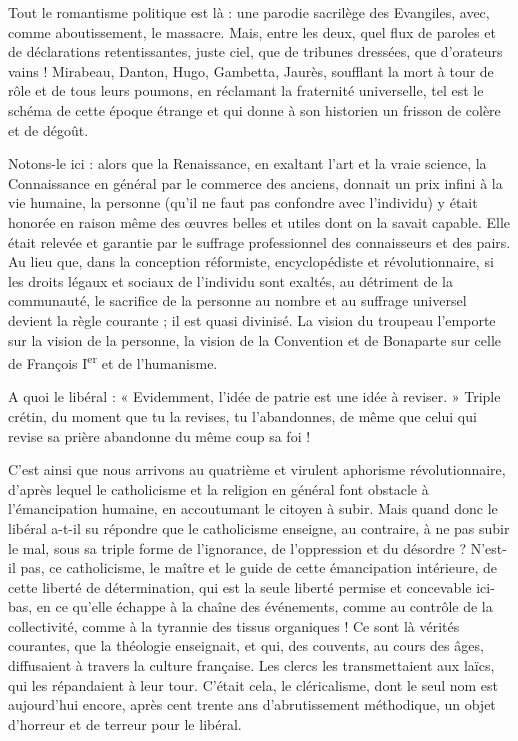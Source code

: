 \documentclass[french,twoside]{book} %
\begin{document}
\noindent Tout le romantisme politique est là : une parodie sacrilège des Evangiles, avec, comme aboutissement, le massacre. Mais, entre les deux, quel flux de paroles et de déclarations retentissantes, juste ciel, que de tribunes dressées, que d’orateurs vains ! Mirabeau, Danton, Hugo, Gambetta, Jaurès, soufflant la mort à tour de rôle et de tous leurs poumons, en réclamant la fraternité universelle, tel est le schéma de cette époque étrange et qui donne à son historien un frisson de colère et de dégoût.\par
Notons-le ici : alors que la Renaissance, en exaltant l’art et la vraie science, la Connaissance en général par le commerce des anciens, donnait un prix infini à la vie humaine, la personne (qu’il ne faut pas confondre avec l’individu) y était honorée en raison même des œuvres belles et utiles dont on la savait capable. Elle était relevée et garantie par le suffrage professionnel des connaisseurs et des pairs. Au lieu que, dans la conception réformiste, encyclopédiste et révolutionnaire, si les droits légaux et sociaux de l’individu sont exaltés, au détriment de la communauté, le sacrifice de la personne au nombre et au suffrage universel devient la règle courante ; il est quasi divinisé. La vision du troupeau l’emporte sur la vision de la personne, la vision de la Convention et de Bonaparte sur celle de François I\textsuperscript{er} et de l’humanisme.\par
A quoi le libéral : « Evidemment, l’idée de patrie est une idée à reviser. » Triple crétin, du moment que tu la revises, tu l’abandonnes, de même que celui qui revise sa prière abandonne du même coup sa foi !\par
C’est ainsi que nous arrivons au quatrième et virulent aphorisme révolutionnaire, d’après lequel le catholicisme et la religion en général font obstacle à l’émancipation humaine, en accoutumant le citoyen à subir. Mais quand donc le libéral a-t-il su répondre que le catholicisme enseigne, au contraire, à ne pas subir le mal, sous sa triple forme de l’ignorance, de l’oppression et du désordre ? N’est-il pas, ce catholicisme, le maître et le guide de cette émancipation intérieure, de cette liberté de détermination, qui est la seule liberté permise et concevable ici-bas, en ce qu’elle échappe à la chaîne des événements, comme au contrôle de la collectivité, comme à la tyrannie des tissus organiques ! Ce sont là vérités courantes, que la théologie enseignait, et qui, des couvents, au cours des âges, diffusaient à travers la culture française. Les clercs les transmettaient aux laïcs, qui les répandaient à leur tour. C’était cela, le cléricalisme, dont le seul nom est aujourd’hui encore, après cent trente ans d’abrutissement méthodique, un objet d’horreur et de terreur pour le libéral.\par
\end{document}
